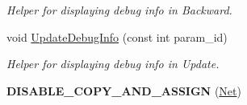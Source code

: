 \begin{DoxyCompactItemize}
\begin{DoxyCompactList}\small\item\em Helper for displaying debug info in Backward. \end{DoxyCompactList}\item 
void \hyperlink{classcaffe_1_1Net_a93a439c92c9218f1dfff16f76d617faa}{Update\+Debug\+Info} (const int param\+\_\+id)\hypertarget{classcaffe_1_1Net_a93a439c92c9218f1dfff16f76d617faa}{}\label{classcaffe_1_1Net_a93a439c92c9218f1dfff16f76d617faa}

\begin{DoxyCompactList}\small\item\em Helper for displaying debug info in Update. \end{DoxyCompactList}\item 
{\bfseries D\+I\+S\+A\+B\+L\+E\+\_\+\+C\+O\+P\+Y\+\_\+\+A\+N\+D\+\_\+\+A\+S\+S\+I\+GN} (\hyperlink{classcaffe_1_1Net}{Net})\hypertarget{classcaffe_1_1Net_a3d52b2d075fa543e687cf61ba035a488}{}\label{classcaffe_1_1Net_a3d52b2d075fa543e687cf61ba035a488}

\end{DoxyCompactItemize}
